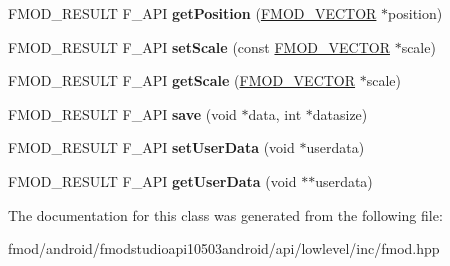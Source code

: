 \begin{DoxyCompactItemize}
\item 
\hypertarget{class_f_m_o_d_1_1_geometry_a2d0e4a6525b54cd9a39c447995eba296}{F\+M\+O\+D\+\_\+\+R\+E\+S\+U\+L\+T F\+\_\+\+A\+P\+I {\bfseries get\+Position} (\hyperlink{struct_f_m_o_d___v_e_c_t_o_r}{F\+M\+O\+D\+\_\+\+V\+E\+C\+T\+O\+R} $\ast$position)}\label{class_f_m_o_d_1_1_geometry_a2d0e4a6525b54cd9a39c447995eba296}

\item 
\hypertarget{class_f_m_o_d_1_1_geometry_a46104dceeff4a02e5aae989f86951b2f}{F\+M\+O\+D\+\_\+\+R\+E\+S\+U\+L\+T F\+\_\+\+A\+P\+I {\bfseries set\+Scale} (const \hyperlink{struct_f_m_o_d___v_e_c_t_o_r}{F\+M\+O\+D\+\_\+\+V\+E\+C\+T\+O\+R} $\ast$scale)}\label{class_f_m_o_d_1_1_geometry_a46104dceeff4a02e5aae989f86951b2f}

\item 
\hypertarget{class_f_m_o_d_1_1_geometry_a40f45f30258de49daf8bee7063afa9e9}{F\+M\+O\+D\+\_\+\+R\+E\+S\+U\+L\+T F\+\_\+\+A\+P\+I {\bfseries get\+Scale} (\hyperlink{struct_f_m_o_d___v_e_c_t_o_r}{F\+M\+O\+D\+\_\+\+V\+E\+C\+T\+O\+R} $\ast$scale)}\label{class_f_m_o_d_1_1_geometry_a40f45f30258de49daf8bee7063afa9e9}

\item 
\hypertarget{class_f_m_o_d_1_1_geometry_a066a05c012e2d41f1ca929ab0328aa25}{F\+M\+O\+D\+\_\+\+R\+E\+S\+U\+L\+T F\+\_\+\+A\+P\+I {\bfseries save} (void $\ast$data, int $\ast$datasize)}\label{class_f_m_o_d_1_1_geometry_a066a05c012e2d41f1ca929ab0328aa25}

\item 
\hypertarget{class_f_m_o_d_1_1_geometry_a9e7359878a030cf144cfdd773dfce85a}{F\+M\+O\+D\+\_\+\+R\+E\+S\+U\+L\+T F\+\_\+\+A\+P\+I {\bfseries set\+User\+Data} (void $\ast$userdata)}\label{class_f_m_o_d_1_1_geometry_a9e7359878a030cf144cfdd773dfce85a}

\item 
\hypertarget{class_f_m_o_d_1_1_geometry_ab8502126a540d836f0fee179f2310c8f}{F\+M\+O\+D\+\_\+\+R\+E\+S\+U\+L\+T F\+\_\+\+A\+P\+I {\bfseries get\+User\+Data} (void $\ast$$\ast$userdata)}\label{class_f_m_o_d_1_1_geometry_ab8502126a540d836f0fee179f2310c8f}

\end{DoxyCompactItemize}


The documentation for this class was generated from the following file\+:\begin{DoxyCompactItemize}
\item 
fmod/android/fmodstudioapi10503android/api/lowlevel/inc/fmod.\+hpp\end{DoxyCompactItemize}

